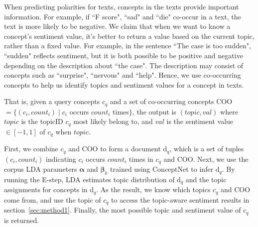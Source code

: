 When predicting polarities for texts, concepts in the texts provide important information. For example, if ``F score", ``sad" and ``die" co-occur in a text, the text is more likely to be negative. We claim that when we want to know a concept's sentiment value, it's better to return a value based on the current topic, rather than a fixed value. For example, in the sentence ``The case is too sudden", ``sudden" reflects sentiment, but it is both possible to be positive and negative depending on the description about ``the case". The description may consist of concepts such as ``surprise", ``nervous" and ``help". Hence, we use co-occurring concepts to help us identify topics and sentiment values for a concept in texts.

That is, given a query concepts $c_q$ and a set of co-occurring concepts COO $= \{(c_i, count_i) \mid c_i$ occurs $count_i$ times$\}$, the output is $(topic, val)$ where $topic$ is the topicID $c_q$ most likely belong to, and $val$ is the sentiment value $\in [-1, 1]$ of $c_q$ when $topic$.

First, we combine $c_q$ and COO to form a document d$_q$, which is a set of tuples $(c_i, count_i)$ indicating $c_i$ occurs $count_i$ times in $c_q$ and COO. Next, we use the corpus LDA parameters $\boldsymbol{\alpha}$ and $\boldsymbol{\beta}_k$ trained using ConceptNet to infer d$_q$. By running the E-step, LDA estimates topic distribution of d$_q$ and the topic assignments for concepts in d$_q$. As the result, we know which topics $c_q$ and COO come from, and use the topic of $c_q$ to access the topic-aware sentiment results in section~\ref{sec:method1}. Finally, the most possible topic and sentiment value of $c_q$ is returned.



